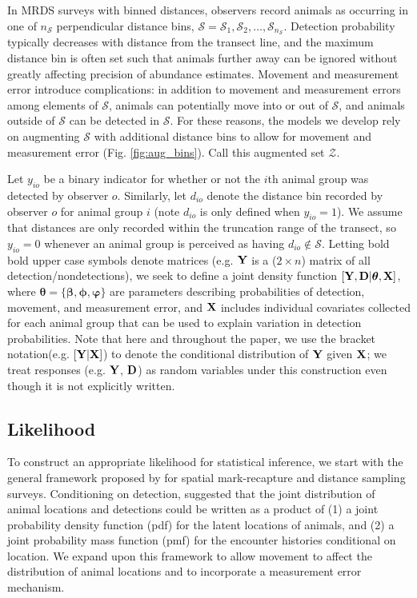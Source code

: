 \documentclass[aoas,preprint]{imsart}
\numberwithin{equation}{section}
\theoremstyle{plain}
\begin{document}
In MRDS surveys with binned distances, observers record animals as occurring in one of $n_\mathcal{S}$ perpendicular distance bins, $\mathcal{S} = \mathcal{S}_1,\mathcal{S}_2,\hdots,\mathcal{S}_{n_\mathcal{S}}$.  Detection probability typically decreases with distance from the transect line, and the maximum distance bin is often set such that animals further away can be ignored without greatly affecting precision of abundance estimates.  Movement and measurement error introduce complications: in addition to movement and measurement errors among elements of $\mathcal{S}$, animals can potentially move into or out of $\mathcal{S}$, and animals outside of $\mathcal{S}$ can be detected in $\mathcal{S}$.  For these reasons, the models we develop rely on augmenting $\mathcal{S}$ with additional distance bins to allow for movement and measurement error (Fig. \ref{fig:aug_bins}).  Call this augmented set $\mathcal{Z}$.

Let $y_{io}$ be a binary indicator for whether or not the $i$th animal group was detected by observer $o$.  Similarly, let $d_{io}$ denote the distance bin recorded by observer $o$ for animal group $i$ (note $d_{io}$ is only defined when $y_{io}=1$). We assume that distances are only recorded within the truncation range of the transect, so $y_{io}=0$ whenever an animal group is perceived as having $d_{io} \notin \mathcal{S}$.  Letting bold bold upper case symbols denote matrices (e.g. ${\bf Y}$ is a ($2 \times n$) matrix of all detection/nondetections),  we seek to define a joint density function $[{\bf Y},{\bf D}|\boldsymbol{\theta},{\bf X}]$, where $\boldsymbol{\theta}= \{ \boldsymbol{\beta,\phi,\varphi} \}$ are parameters describing probabilities of detection, movement, and measurement error, and ${\bf X}$ includes individual covariates collected for each animal group that can be used to explain variation in detection probabilities.  Note that here and throughout the paper, we use the bracket notation(e.g.  $[\textbf{Y}|\textbf{X}]$) to denote the conditional distribution of $\textbf{Y}$ given $\textbf{X}$; we treat responses (e.g. $\textbf{Y}$, $\textbf{D}$) as random variables under this construction even though it is not explicitly written.

\subsection{Likelihood}

To construct an appropriate likelihood for statistical inference, we start with the general framework proposed by \citet{BorchersEtAl2015} for spatial mark-recapture and distance sampling surveys.  Conditioning on detection, \citet{BorchersEtAl2015} suggested that the joint distribution of animal locations and detections could be written as a product of (1) a joint probability density function (pdf) for the latent locations of animals, and (2) a joint probability mass function (pmf) for the encounter histories conditional on location.  We expand upon this framework to allow movement to affect the distribution of animal locations and to incorporate a measurement error mechanism.
\end{document}
